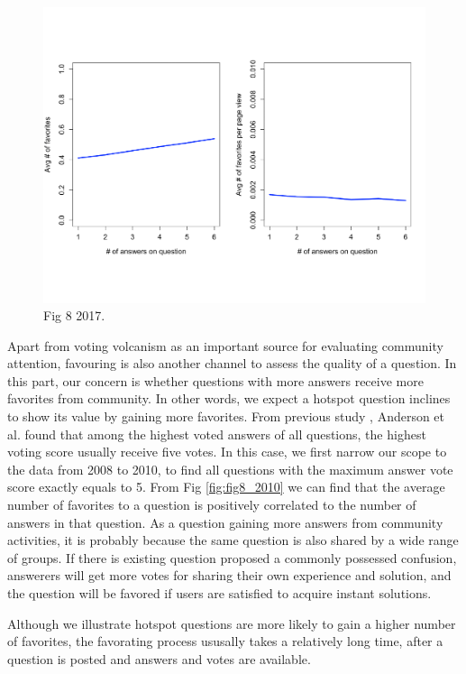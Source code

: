 \begin{figure}[!t]
	\centering
	\includegraphics[width=0.8\columnwidth]{img/Fig8_2017.pdf}
	\caption{Fig 8 2017.}
	\label{fig:fig8_2017}
\end{figure}

Apart from voting volcanism as an important source for evaluating community attention, favouring is also another channel to assess the quality of a question. In this part, our concern is whether questions with more answers receive more favorites from community. In other words, we expect a hotspot question inclines to show its value by gaining more favorites. From previous study \cite{anderson2012discovering}, Anderson et al. found that among the highest voted answers of all questions, the highest voting score usually receive five votes. In this case, we first narrow our scope to the data from 2008 to 2010, to find all questions with the maximum answer vote score exactly equals to 5. From Fig \ref{fig:fig8_2010} we can find that the average number of favorites to a question is positively correlated to the number of answers in that question. As a question gaining more answers from community activities, it is probably because the same question is also shared by a wide range of groups. If there is existing question proposed a commonly possessed confusion, answerers will get more votes for sharing their own experience and solution, and the question will be favored if users are satisfied to acquire instant solutions. %

Although we illustrate hotspot questions are more likely to gain a higher number of favorites, the favorating process ususally takes a relatively long time, after a question is posted and answers and votes are available. 